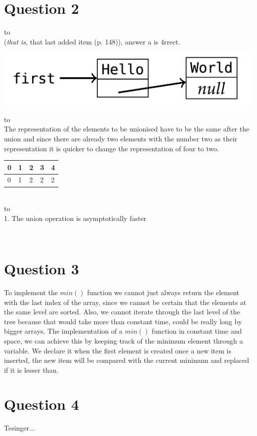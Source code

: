 \documentclass[a4paper]{article}
\def\headline#1{\hbox to \hsize{\hrulefill\quad\lower.3em\hbox{#1}\quad\hrulefill}}
\begin{document}
\section*{Question 2}
\headline{a} \ \\

\noindent
(\textit{that is}, that last added item (p. 148)), answer a is 4rrect.
\ \\

\begin{center}
\includegraphics[scale=0.22]{figure2.png}
\end{center}

\headline{b} \ \\

\noindent
The representation of the elements to be unionised have to be the same after the union and since there are already two elements with the number two as their representation it is quicker to change the representation of four to two.\\
\begin{center}
\begin{tabular}{|l||l||l||l||l|}
\hline
0 & 1 & 2 & 3 & 4\\ 
\hline
0 & 1 & 2 & 2 & 2\\
\hline
\end{tabular}
\end{center}
\ \\

\headline{c} \ \\

1. The union operation is asymptotically faster

\ \\

\section*{Question 3}

\noindent
To implement the $min()$ function we cannot just always return the element with 
the last index of the array, since we cannot be certain that the elements at the 
same level are sorted. Also, we cannot iterate through the last level of the tree 
because that would take more than constant time, could be really long by bigger arrays.  
The implementation of a $min()$ function in constant time and space, we can
achieve this by keeping track of the minimum element through a variable. We declare it when 
the first element is created once a new item is inserted, the new item will be 
compared with the current minimum and replaced if it is lesser than.


\section*{Question 4}

\noindent
Tesinger...
\end{document}
